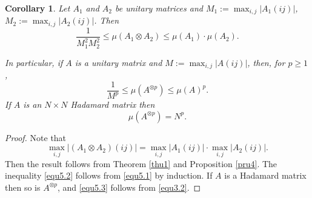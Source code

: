 \documentclass[11pt]{amsart}
\newtheorem{corollary}[theorem]{Corollary}
\theoremstyle{definition}
\theoremstyle{remark}
\numberwithin{equation}{section}
\begin{document}
\begin{corollary}\label{coru5}
Let $A_1$ and $A_2$ be unitary matrices and $M_1:=\max_{i,j}|A_1(ij)|$, $M_2:=\max_{i,j}|A_2(ij)|$. Then
\begin{equation}
\frac{1}{M_1^2M_2^2}\leq \mu(A_1\otimes A_2)\leq \mu(A_1)\cdot \mu(A_2).
\label{equ5.1}
\end{equation}

In particular, if $A$ is a unitary matrix and $M:=\max_{i,j}|A(ij)|$, then, for $p\geq 1$,
\begin{equation}
\frac{1}{M^p}\leq \mu(A^{\otimes p})\leq \mu(A)^p.
\label{equ5.2}
\end{equation}
If $A$ is an $N\times N$ Hadamard matrix then
\begin{equation}
\mu(A^{\otimes p})=N^p.
\label{equ5.3}
\end{equation}
\end{corollary}

\begin{proof}
Note that
$$\max_{i,j}|(A_1\otimes A_2)(ij)|=\max_{i,j}|A_1(ij)|\cdot \max_{i,j}|A_2(ij)|.$$
Then the result follows from Theorem \ref{thu1} and Proposition \ref{pru4}. The inequality \eqref{equ5.2} follows from \eqref{equ5.1} by induction. If $A$ is a Hadamard matrix then so is $A^{\otimes p}$, and \eqref{equ5.3} follows from \eqref{equ3.2}.
\end{proof}
\end{document}
